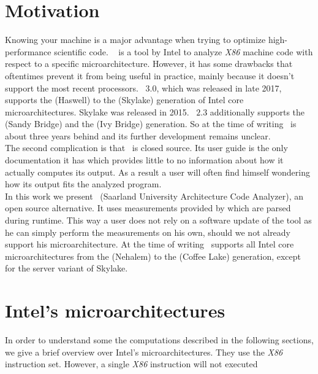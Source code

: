 
\section{Motivation}

Knowing your machine is a major advantage when trying to optimize high-performance scientific code. \iaca\ \cite{iaca} is a tool by Intel to analyze \emph{X86} machine code with respect to a specific microarchitecture. However, it has some drawbacks that oftentimes prevent it from being useful in practice, mainly because it doesn't support the most recent processors. \iaca\ $3.0$, which was released in late 2017, supports the  (Haswell) to the  (Skylake) generation of Intel core microarchitectures. Skylake was released in 2015. \iaca\ $2.3$ additionally supports the  (Sandy Bridge) and the  (Ivy Bridge) generation. So at the time of writing \iaca\ is about three years behind and its further development remains unclear.\\
The second complication is that \iaca\ is closed source. Its user guide \cite{userguide} is the only documentation it has which provides little to no information about how it actually computes its output. As a result a user will often find himself wondering how its output fits the analyzed program.\\
In this work we present \suaca\ (Saarland University Architecture Code Analyzer), an open source alternative. It uses measurements provided by \cite{Andreas} which are parsed during runtime. This way a user does not rely on a software update of the tool as he can simply perform the measurements on his own, should we not already support his microarchitecture. At the time of writing \suaca\ supports all Intel core microarchitectures from the  (Nehalem) to the  (Coffee Lake) generation, except for the server variant of Skylake.
\newpage

\section{Intel's microarchitectures}


In order to understand some the computations described in the following sections, we give a brief overview over Intel's microarchitectures. They use the \emph{X86} instruction set. However, a single \emph{X86} instruction will not executed



